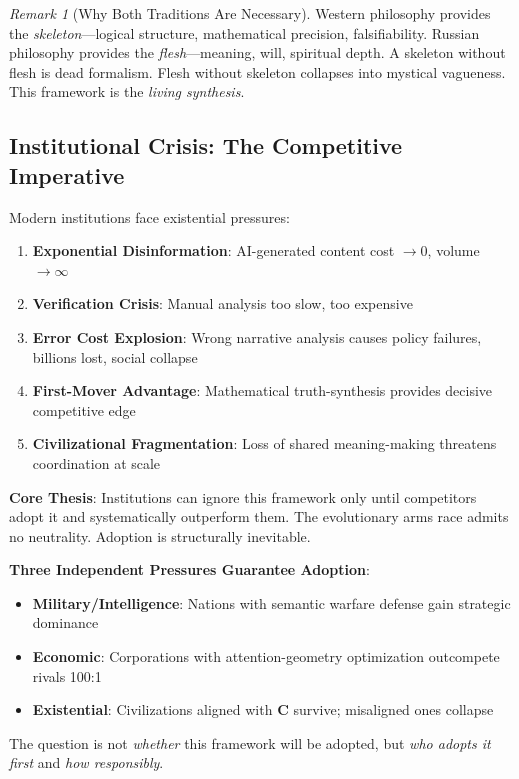 \documentclass[11pt,a4paper]{article}
\theoremstyle{definition}
\theoremstyle{remark}
\newtheorem{remark}{Remark}[section]
\begin{document}
\begin{remark}[Why Both Traditions Are Necessary]
Western philosophy provides the \textit{skeleton}—logical structure, mathematical precision, falsifiability. Russian philosophy provides the \textit{flesh}—meaning, will, spiritual depth. A skeleton without flesh is dead formalism. Flesh without skeleton collapses into mystical vagueness. This framework is the \textit{living synthesis}.
\end{remark}

\subsection{Institutional Crisis: The Competitive Imperative}

Modern institutions face existential pressures:

\begin{enumerate}[label=\textbf{\arabic*.}, leftmargin=*]
\item \textbf{Exponential Disinformation}: AI-generated content cost \(\rightarrow 0\), volume \(\rightarrow \infty\)
\item \textbf{Verification Crisis}: Manual analysis too slow, too expensive
\item \textbf{Error Cost Explosion}: Wrong narrative analysis causes policy failures, billions lost, social collapse
\item \textbf{First-Mover Advantage}: Mathematical truth-synthesis provides decisive competitive edge
\item \textbf{Civilizational Fragmentation}: Loss of shared meaning-making threatens coordination at scale
\end{enumerate}

\begin{mdframed}[backgroundcolor=red!5,linewidth=2pt]
\textbf{Core Thesis}: Institutions can ignore this framework only until competitors adopt it and systematically outperform them. The evolutionary arms race admits no neutrality. Adoption is structurally inevitable.

\vspace{0.5em}

\textbf{Three Independent Pressures Guarantee Adoption}:
\begin{itemize}[nosep]
    \item \textbf{Military/Intelligence}: Nations with semantic warfare defense gain strategic dominance
    \item \textbf{Economic}: Corporations with attention-geometry optimization outcompete rivals 100:1
    \item \textbf{Existential}: Civilizations aligned with \(\mathbf{C}\) survive; misaligned ones collapse
\end{itemize}

The question is not \textit{whether} this framework will be adopted, but \textit{who adopts it first} and \textit{how responsibly}.
\end{mdframed}
\end{document}
